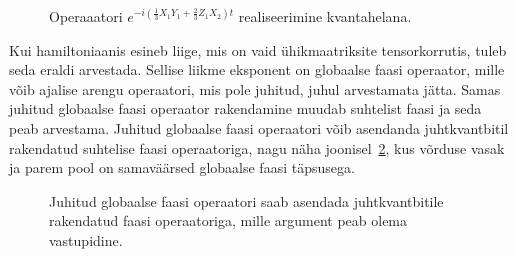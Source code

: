 \documentclass[12pt]{report}
\def\paren#1{\left(#1\right)}
\begin{document}
\begin{figure}
    \centering
    \ifdefined\yquanton
    \fi
    \caption{Operaaatori \(e^{-i\paren{\frac{1}{3}X_1Y_1+\frac{2}{3}Z_1X_2} t}\) realiseerimine kvantahelana.}
    \label{fig:trotexctrl}
\end{figure}

Kui hamiltoniaanis esineb liige, mis on vaid ühikmaatriksite tensorkorrutis, tuleb seda eraldi arvestada.
Sellise liikme eksponent on globaalse faasi operaator, mille võib ajalise arengu operaatori, mis pole juhitud, juhul arvestamata jätta.
Samas juhitud globaalse faasi operaator rakendamine muudab suhtelist faasi ja seda peab arvestama.
Juhitud globaalse faasi operaatori võib asendanda juhtkvantbitil rakendatud suhtelise faasi operaatoriga, nagu näha joonisel~\ref{fig:globphase}, kus võrduse vasak ja parem pool on samaväärsed globaalse faasi täpsusega.

\begin{figure}[h]
    \centering
    \ifdefined\yquanton
    \fi
    \caption{Juhitud globaalse faasi operaatori saab asendada juhtkvantbitile rakendatud faasi operaatoriga, mille argument peab olema vastupidine.}
    \label{fig:globphase}
\end{figure}
\end{document}
